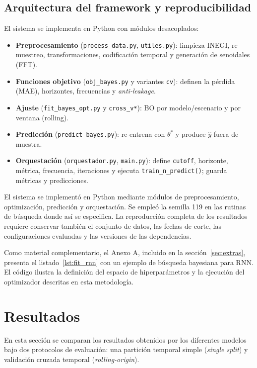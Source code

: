 \documentclass[12pt,letterpaper]{article}
\begin{document}
\subsection{Arquitectura del framework y reproducibilidad}
El sistema se implementa en Python con módulos desacoplados:
\begin{itemize}
    \item \textbf{Preprocesamiento} (\texttt{process\_data.py}, \texttt{utiles.py}): limpieza INEGI, re-muestreo, transformaciones, codificación temporal y generación de senoidales (FFT).
    \item \textbf{Funciones objetivo} (\texttt{obj\_bayes.py} y variantes \texttt{cv}): definen la pérdida (MAE), horizontes, frecuencias y \textit{anti-leakage}.
    \item \textbf{Ajuste} (\texttt{fit\_bayes\_opt.py} y \texttt{cross\_v*}): BO por modelo/escenario y por ventana (rolling).
    \item \textbf{Predicción} (\texttt{predict\_bayes.py}): re-entrena con \(\theta^*\) y produce \(\hat{y}\) fuera de muestra.
    \item \textbf{Orquestación} (\texttt{orquestador.py}, \texttt{main.py}): define \texttt{cutoff}, horizonte, métrica, frecuencia, iteraciones y ejecuta \texttt{train\_n\_predict()}; guarda métricas y predicciones.
\end{itemize}
El sistema se implementó en Python mediante módulos de preprocesamiento,
optimización, predicción y orquestación. Se empleó la semilla 119 en las rutinas
de búsqueda donde así se especifica. La reproducción completa de los resultados
requiere conservar también el conjunto de datos, las fechas de corte, las
configuraciones evaluadas y las versiones de las dependencias.

Como material complementario, el Anexo A, incluido en la sección~\ref{sec:extras}, presenta el listado~\ref{lst:fit_rnn} con un ejemplo de búsqueda bayesiana para RNN. El código ilustra la definición del espacio de hiperparámetros y la ejecución del optimizador descritas en esta metodología.

\section{Resultados}

En esta sección se comparan los resultados obtenidos por los diferentes modelos bajo dos protocolos de evaluación: una partición temporal simple (\textit{single split}) y validación cruzada temporal (\textit{rolling-origin}).
\end{document}
